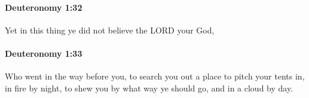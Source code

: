 		\paragraph{Deuteronomy 1:32} %
			\label{DEUTERONOMY-1-32}

			Yet in this thing ye did not believe the LORD your God,


		\paragraph{Deuteronomy 1:33} %
			\label{DEUTERONOMY-1-33}

			Who went in the way before you, to search you out a place to pitch your tents in, in fire by night, to shew you by what way ye should go, and in a cloud by day.


